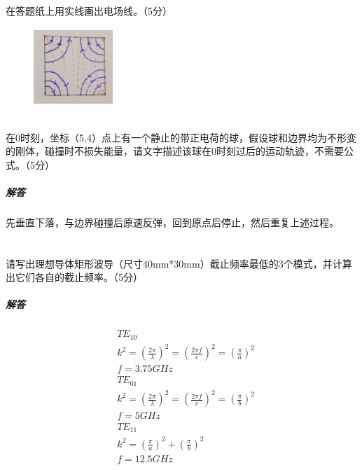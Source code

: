 \documentclass[UTF8]{ctexart}
\begin{document}
\paragraph{}
在答题纸上用实线画出电场线。（5分）
\begin{figure}[htbp]
\centering
\includegraphics[width=3cm,height=3cm]{2015-2.jpg}
\end{figure}
\subsection{}
\paragraph{}
在0时刻，坐标（5,4）点上有一个静止的带正电荷的球，假设球和边界均为不形变的刚体，碰撞时不损失能量，请文字描述该球在0时刻过后的运动轨迹，不需要公式。（5分）
\subparagraph{解答}
先垂直下落，与边界碰撞后原速反弹，回到原点后停止，然后重复上述过程。
\section{}
\subsection{}
\paragraph{}
请写出理想导体矩形波导（尺寸40mm*30mm）截止频率最低的3个模式，并计算出它们各自的截止频率。（5分）
\subparagraph{解答}
\begin{equation*}
\begin{aligned}
&TE_{10}\\
&k^2=(\frac{2\pi}{\lambda})^2=(\frac{2\pi f}{c})^2=(\frac{\pi}{a})^2\\
&f=3.75GHz\\
&TE_{01}\\
&k^2=(\frac{2\pi}{\lambda})^2=(\frac{2\pi f}{c})^2=(\frac{\pi}{b})^2\\
&f=5GHz\\
&TE_{11}\\
&k^2=(\frac{\pi}{a})^2+(\frac{\pi}{b})^2\\
&f=12.5GHz
\end{aligned}
\end{equation*}
\end{document}
